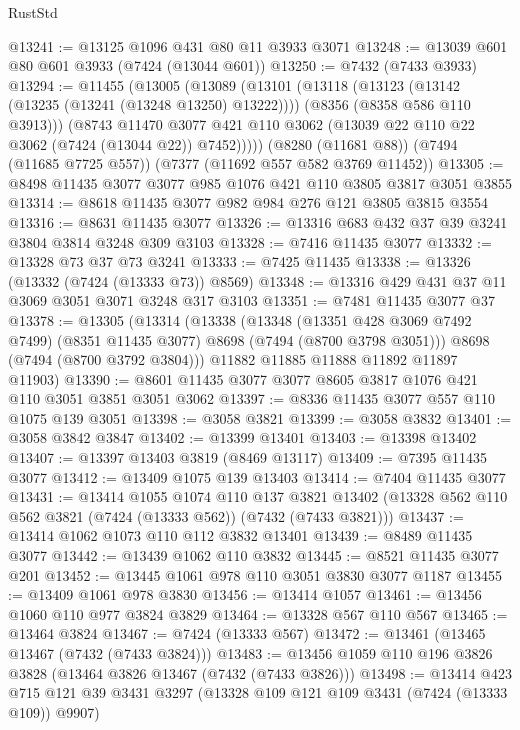 \begin{lexlean}{RustStd}
\begin{coremodule}
{\begin{coremodule}
{{{{{{{{{{{{{{{{{{{{{{{{{{{{{{{{@13241 := @13125 @1096 @431 @80 @11 @3933 @3071
@13248 := @13039 @601 @80 @601 @3933 (@7424 (@13044 @601))
@13250 := @7432 (@7433 @3933)
@13294 := @11455
    (@13005
      (@13089
        (@13101
          (@13118
            (@13123 (@13142 (@13235 (@13241 (@13248 @13250) @13222))))
            (@8356 (@8358 @586 @110 @3913)))
          (@8743
            @11470
            @3077
            @421
            @110
            @3062
            (@13039 @22 @110 @22 @3062 (@7424 (@13044 @22)) @7452)))))
    (@8280 (@11681 @88))
    (@7494 (@11685 @7725 @557))
    (@7377 (@11692 @557 @582 @3769 @11452))
@13305 := @8498 @11435 @3077 @3077 @985 @1076 @421 @110 @3805 @3817 @3051 @3855
@13314 := @8618 @11435 @3077 @982 @984 @276 @121 @3805 @3815 @3554
@13316 := @8631 @11435 @3077
@13326 := @13316 @683 @432 @37 @39 @3241 @3804 @3814 @3248 @309 @3103
@13328 := @7416 @11435 @3077
@13332 := @13328 @73 @37 @73 @3241
@13333 := @7425 @11435
@13338 := @13326 (@13332 (@7424 (@13333 @73)) @8569)
@13348 := @13316 @429 @431 @37 @11 @3069 @3051 @3071 @3248 @317 @3103
@13351 := @7481 @11435 @3077 @37
@13378 := @13305
    (@13314
      (@13338
        (@13348
          (@13351 @428 @3069 @7492 @7499)
          (@8351 @11435 @3077)
          @8698
          (@7494 (@8700 @3798 @3051)))
        @8698
        (@7494 (@8700 @3792 @3804)))
      @11882
      @11885
      @11888
      @11892
      @11897
      @11903)
@13390 := @8601 @11435 @3077 @3077 @8605 @3817 @1076 @421 @110 @3051 @3851 @3051 @3062
@13397 := @8336 @11435 @3077 @557 @110 @1075 @139 @3051
@13398 := @3058 @3821
@13399 := @3058 @3832
@13401 := @3058 @3842 @3847
@13402 := @13399 @13401
@13403 := @13398 @13402
@13407 := @13397 @13403 @3819 (@8469 @13117)
@13409 := @7395 @11435 @3077
@13412 := @13409 @1075 @139 @13403
@13414 := @7404 @11435 @3077
@13431 := @13414
    @1055
    @1074
    @110
    @137
    @3821
    @13402
    (@13328 @562 @110 @562 @3821 (@7424 (@13333 @562)) (@7432 (@7433 @3821)))
@13437 := @13414 @1062 @1073 @110 @112 @3832 @13401
@13439 := @8489 @11435 @3077
@13442 := @13439 @1062 @110 @3832
@13445 := @8521 @11435 @3077 @201
@13452 := @13445 @1061 @978 @110 @3051 @3830 @3077 @1187
@13455 := @13409 @1061 @978 @3830
@13456 := @13414 @1057
@13461 := @13456 @1060 @110 @977 @3824 @3829
@13464 := @13328 @567 @110 @567
@13465 := @13464 @3824
@13467 := @7424 (@13333 @567)
@13472 := @13461 (@13465 @13467 (@7432 (@7433 @3824)))
@13483 := @13456 @1059 @110 @196 @3826 @3828 (@13464 @3826 @13467 (@7432 (@7433 @3826)))
@13498 := @13414
    @423
    @715
    @121
    @39
    @3431
    @3297
    (@13328 @109 @121 @109 @3431 (@7424 (@13333 @109)) @9907)
}}}}}}}}}}}}}}}}}}}}}}}}}}}}}}}}
\end{coremodule}}
\end{coremodule}
\end{lexlean}
